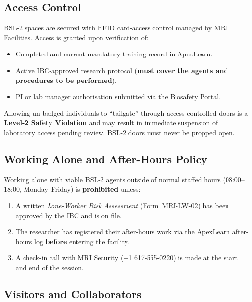 \subsection{Access Control}

BSL-2 spaces are secured with RFID card-access control managed by MRI Facilities.
Access is granted upon verification of:

\begin{itemize}[leftmargin=1.6em, itemsep=2pt]
  \item Completed and current mandatory training record in ApexLearn.
  \item Active IBC-approved research protocol (\textbf{must cover the agents and
        procedures to be performed}).
  \item PI or lab manager authorisation submitted via the Biosafety Portal.
\end{itemize}

\begin{warningbox}
\small
Allowing un-badged individuals to ``tailgate'' through access-controlled doors is a
\textbf{Level-2 Safety Violation} and may result in immediate suspension of laboratory
access pending review. BSL-2 doors must never be propped open.
\end{warningbox}

\subsection{Working Alone and After-Hours Policy}

Working alone with viable BSL-2 agents outside of normal staffed hours (08:00--18:00,
Monday--Friday) is \textbf{prohibited} unless:

\begin{enumerate}[leftmargin=1.8em, itemsep=2pt,
                  label=\textbf{\color{BSLamber}\arabic*.}]
  \item A written \emph{Lone-Worker Risk Assessment} (Form~MRI-LW-02) has been
        approved by the IBC and is on file.
  \item The researcher has registered their after-hours work via the ApexLearn
        after-hours log \textbf{before} entering the facility.
  \item A check-in call with MRI Security (+1 617-555-0220) is made at the start
        and end of the session.
\end{enumerate}

\subsection{Visitors and Collaborators}


